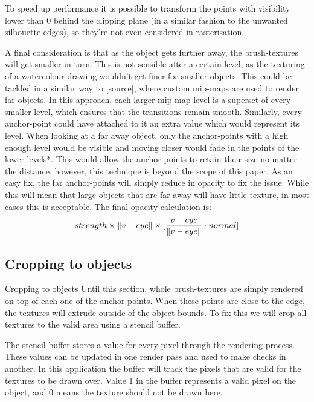 \documentclass[a4paper, 12pt]{article}
\DeclarePairedDelimiter{\norm}{\lVert}{\rVert}
\begin{document}
To speed up performance it is possible to transform the points with visibility lower than 0 behind the clipping plane (in a similar fashion to the unwanted silhouette edges), so they're not even considered in rasterisation.

A final consideration is that as the object gets further away, the brush-textures will get smaller in turn. This is not sensible after a certain level, as the texturing of a watercolour drawing wouldn't get finer for smaller objects. This could be tackled in a similar way to [source], where custom mip-maps are used to render far objects. In this approach, each larger mip-map level is a superset of every smaller level, which ensures that the transitions remain smooth. Similarly, every anchor-point could have attached to it an extra value which would represent its level. When looking at a far away object, only the anchor-points with a high enough level would be visible and moving closer would fade in the points of the lower levels*. This would allow the anchor-points to retain their size no matter the distance, however, this technique is beyond the scope of this paper. As an easy fix, the far anchor-points will simply reduce in opacity to fix the issue. While this will mean that large objects that are far away will have little texture, in most cases this is acceptable. The final opacity calculation is:
$$strength \times \norm{v-eye} \times [\frac{v-eye}{\norm{v-eye}} \cdot normal]$$


\subsection{Cropping to objects}
Cropping to objects
Until this section, whole brush-textures are simply rendered on top of each one of the anchor-points. When these points are close to the edge, the textures will extrude outside of the object bounds. To fix this we will crop all textures to the valid area using a stencil buffer.

The stencil buffer stores a value for every pixel through the rendering process. These values can be updated in one render pass and used to make checks in another. In this application the buffer will track the pixels that are valid for the textures to be drawn over. Value 1 in the buffer represents a valid pixel on the object, and 0 means the texture should not be drawn here.
\end{document}
